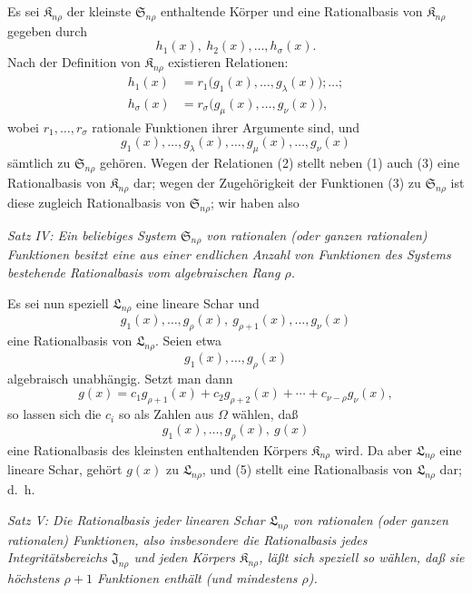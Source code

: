 \documentclass[11pt]{article}
\providecommand{\Kfield}{\mathfrak{K}}
\providecommand{\Ssys}{\mathfrak{S}}
\providecommand{\Jdom}{\mathfrak{J}}
\providecommand{\Lsys}{\mathfrak{L}}
\begin{document}
Es sei $\Kfield_{n\rho}$ der kleinste $\Ssys_{n\rho}$ enthaltende Körper und eine Rationalbasis von $\Kfield_{n\rho}$ gegeben durch
\begin{equation}
  h_1(x),\ h_2(x),\ldots,h_\sigma(x).
\tag{1}
\end{equation}
Nach der Definition von $\Kfield_{n\rho}$ existieren Relationen:
\begin{equation}
\begin{aligned}
 h_1(x)&=r_1\bigl(g_1(x),\ldots,g_\lambda(x)\bigr);\ldots;\\
 h_\sigma(x)&=r_\sigma\bigl(g_\mu(x),\ldots,g_\nu(x)\bigr),
\end{aligned}
\tag{2}
\end{equation}
wobei $r_1,
\ldots,r_\sigma$ rationale Funktionen ihrer Argumente sind, und
\begin{equation}
  g_1(x),\ldots,g_\lambda(x),\ldots,
  g_\mu(x),\ldots,g_\nu(x)
\tag{3}
\end{equation}
sämtlich zu $\Ssys_{n\rho}$ gehören. Wegen der Relationen (2) stellt neben (1) auch (3) eine Rationalbasis von $\Kfield_{n\rho}$ dar; wegen der Zugehörigkeit der Funktionen (3) zu $\Ssys_{n\rho}$ ist diese zugleich Rationalbasis von $\Ssys_{n\rho}$; wir haben also

\emph{Satz IV: Ein beliebiges System $\Ssys_{n\rho}$ von rationalen (oder ganzen rationalen) Funktionen besitzt eine aus einer endlichen Anzahl von Funktionen des Systems bestehende Rationalbasis vom algebraischen Rang $\rho$.}

Es sei nun speziell $\Lsys_{n\rho}$ eine lineare Schar und
\begin{equation}
  g_1(x),\ldots,g_\rho(x),\ g_{\rho+1}(x),\ldots,g_\nu(x)
\tag{4}
\end{equation}
eine Rationalbasis von $\Lsys_{n\rho}$. Seien etwa
\[
  g_1(x),\ldots,g_\rho(x)
\]
algebraisch unabhängig. Setzt man dann
\[
  g(x)=c_1g_{\rho+1}(x)+c_2g_{\rho+2}(x)+\cdots+c_{\nu-\rho}g_\nu(x),
\]
so lassen sich die $c_i$ so als Zahlen aus $\Omega$ wählen, daß
\begin{equation}
  g_1(x),\ldots,g_\rho(x),\ g(x)
\tag{5}
\end{equation}
eine Rationalbasis des kleinsten enthaltenden Körpers $\Kfield_{n\rho}$ wird. Da aber $\Lsys_{n\rho}$ eine lineare Schar, gehört $g(x)$ zu $\Lsys_{n\rho}$, und (5) stellt eine Rationalbasis von $\Lsys_{n\rho}$ dar; d.~h.

\emph{Satz V: Die Rationalbasis jeder linearen Schar $\Lsys_{n\rho}$ von rationalen (oder ganzen rationalen) Funktionen, also insbesondere die Rationalbasis jedes Integritätsbereichs $\Jdom_{n\rho}$ und jeden Körpers $\Kfield_{n\rho}$, läßt sich speziell so wählen, daß sie höchstens $\rho+1$ Funktionen enthält (und mindestens $\rho$).}
\end{document}
